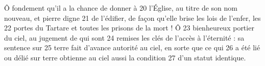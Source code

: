 Ô fondement qu'il a la chance de donner à	 
20	 	l'Église, au titre de son nom nouveau, et pierre digne	 
21	 	de l'édifier, de façon qu'elle brise les lois de l'enfer, les	 
22	 	portes du Tartare et toutes les prisons de la mort ! Ô	 
23	 	bienheureux portier du ciel, au jugement de qui sont	 
24	 	remises les clés de l'accès à l'éternité : sa sentence sur	 
25	 	terre fait d'avance autorité au ciel, en sorte que ce qui	 
26	 	a été lié ou délié sur terre obtienne au ciel aussi la condition	 
27	 	d'un statut identique.